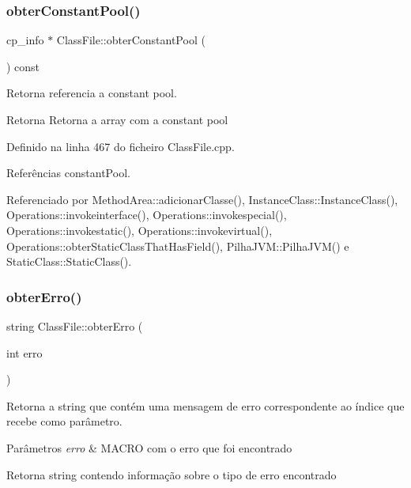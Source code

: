 \subsubsection{\texorpdfstring{obter\+Constant\+Pool()}{obterConstantPool()}}
{\footnotesize\ttfamily cp\+\_\+info $\ast$ Class\+File\+::obter\+Constant\+Pool (\begin{DoxyParamCaption}{ }\end{DoxyParamCaption}) const}



Retorna referencia a constant pool. 

\begin{DoxyReturn}{Retorna}
Retorna a array com a constant pool 
\end{DoxyReturn}


Definido na linha 467 do ficheiro Class\+File.\+cpp.



Referências constant\+Pool.



Referenciado por Method\+Area\+::adicionar\+Classe(), Instance\+Class\+::\+Instance\+Class(), Operations\+::invokeinterface(), Operations\+::invokespecial(), Operations\+::invokestatic(), Operations\+::invokevirtual(), Operations\+::obter\+Static\+Class\+That\+Has\+Field(), Pilha\+J\+V\+M\+::\+Pilha\+J\+V\+M() e Static\+Class\+::\+Static\+Class().

\mbox{\label{classClassFile_a32767b8d966ef87249aa3a41ec5d67c3}} 
\subsubsection{\texorpdfstring{obter\+Erro()}{obterErro()}}
{\footnotesize\ttfamily string Class\+File\+::obter\+Erro (\begin{DoxyParamCaption}\item[{int}]{erro }\end{DoxyParamCaption})\hspace{0.3cm}{\ttfamily [private]}}



Retorna a string que contém uma mensagem de erro correspondente ao índice que recebe como parâmetro. 


\begin{DoxyParams}{Parâmetros}
{\em erro} & M\+A\+C\+RO com o erro que foi encontrado \\
\hline
\end{DoxyParams}
\begin{DoxyReturn}{Retorna}
string contendo informação sobre o tipo de erro encontrado 
\end{DoxyReturn}


